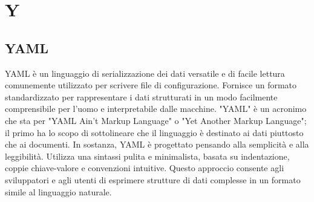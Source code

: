 \section{Y}

\vspace{2em}
\subsection*{YAML}
YAML è un linguaggio di serializzazione dei dati versatile e di facile lettura comunemente utilizzato per scrivere file di configurazione.
Fornisce un formato standardizzato per rappresentare i dati strutturati in un modo facilmente comprensibile per l'uomo e interpretabile dalle macchine. "YAML" è un acronimo che sta per "YAML Ain't Markup Language" o "Yet Another Markup Language"; il primo ha lo scopo di sottolineare che il linguaggio è destinato ai dati piuttosto che ai documenti.
In sostanza, YAML è progettato pensando alla semplicità e alla leggibilità. Utilizza una sintassi pulita e minimalista, basata su indentazione, coppie chiave-valore e convenzioni intuitive. Questo approccio consente agli sviluppatori e agli utenti di esprimere strutture di dati complesse in un formato simile al linguaggio naturale.
